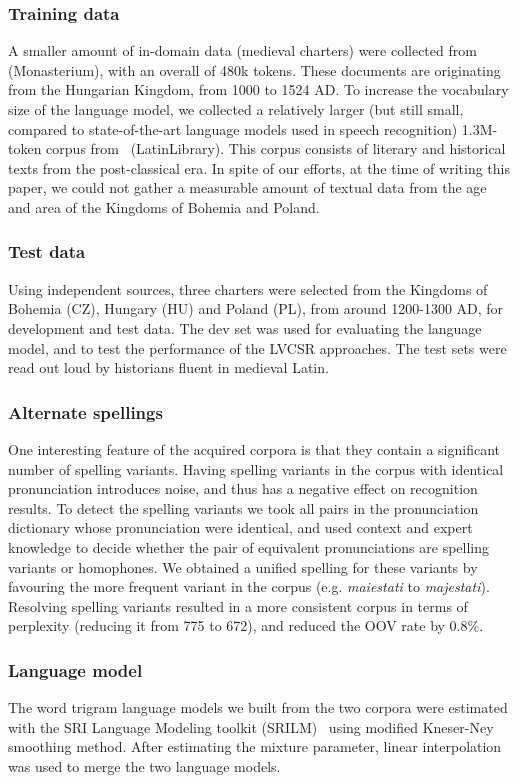 \documentclass[runningheads,a4paper]{llncs}
\begin{document}
\subsubsection{Training data}\label{traintext}
A smaller amount of in-domain data (medieval charters) were collected from~\cite{monasterium} (Monasterium), with an overall of 480k tokens.
These documents are originating from the Hungarian Kingdom, from 1000 to 1524 AD.
To increase the vocabulary size of the language model, we collected a relatively larger (but still small, compared to state-of-the-art language models used in speech recognition) 1.3M-token corpus from~\cite{latinlibrary} (LatinLibrary).
This corpus consists of literary and historical texts from the post-classical era.
In spite of our efforts, at the time of writing this paper, we could not gather a measurable amount of textual data from the age and area of the Kingdoms of Bohemia and Poland.
\subsubsection{Test data}\label{testtext}
Using independent sources, three charters were selected from the Kingdoms of Bohemia (CZ), Hungary (HU) and Poland (PL), from around 1200-1300 AD, for development and test data.
The dev set was used for evaluating the language model, and to test the performance of the LVCSR approaches.
The test sets were read out loud by historians fluent in medieval Latin.
\subsubsection{Alternate spellings}
One interesting feature of the acquired corpora is that they contain a significant number of spelling variants.
Having spelling variants in the corpus with identical pronunciation introduces noise, and thus has a negative effect on recognition results.
To detect the spelling variants we took all pairs in the pronunciation dictionary whose pronunciation were identical, and used context and expert knowledge to decide whether the pair of equivalent pronunciations are spelling variants or homophones.
We obtained a unified spelling for these variants by favouring the more frequent variant in the corpus (e.g. \textit{maiestati} to \textit{majestati}).
Resolving spelling variants resulted in a more consistent corpus in terms of perplexity (reducing it from 775 to 672), and reduced the OOV rate by 0.8\%.
\subsubsection{Language model}
The word trigram language models we built from the two corpora were estimated with the SRI Language Modeling toolkit (SRILM)~\cite{srilm} using modified Kneser-Ney smoothing method.
After estimating the mixture parameter, linear interpolation was used to merge the two language models.
\end{document}

